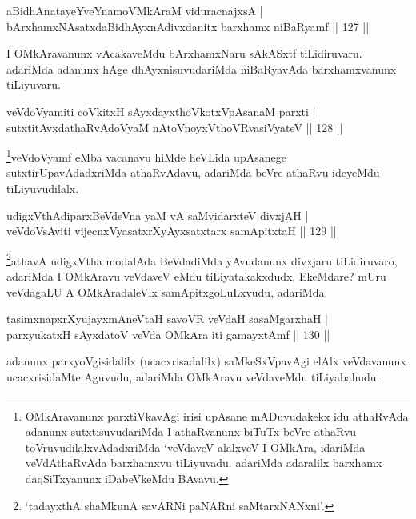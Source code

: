 \begin{shl}
aBidhAnatayeYveYnamoVMkAraM viduracnajxsA  | \\
bArxhamxNAsatxdaBidhAyxnAdivxdanitx barxhamx niBaRyamf \hfill||  127 ||  
\end{shl}

\begin{artha}
I OMkAravanunx vAcakaveMdu bArxhamxNaru sAkASxtf tiLidiruvaru. adariMda adanunx hAge dhAyxnisuvudariMda niBaRyavAda barxhamxvanunx tiLiyuvaru.
\end{artha}


\begin{shl}
veVdoV\s yamiti coVkitxH sAyxdayxthoVkotxVpAsanaM parxti  | \\
sutxtitAvxdathaRvAdoV\s yaM nAtoV\s noyxV\s thoVR\s vasiVyateV \hfill||  128 ||  
\end{shl}

\begin{artha}
\footnote{OMkAravanunx parxtiVkavAgi irisi upAsane mADuvudakekx idu athaRvAda adanunx sutxtisuvudariMda I athaRvanunx biTuTx beVre athaRvu toVruvudilalxvAdadxriMda `veVdaveV alalxveV I OMkAra, idariMda veVdAthaRvAda barxhamxvu tiLiyuvadu. adariMda adaralilx barxhamx daqSiTxyanunx iDabeVkeMdu BAvavu.}veVdoV\s yamf eMba vacanavu hiMde heVLida upAsanege sutxtirUpavAdadxriMda athaRvAdavu, adariMda beVre athaRvu ideyeMdu tiLiyuvudilalx.
\end{artha}


\begin{shl}
udigxVthAdiparxBeVdeVna yaM vA saMvidarxteV divxjAH  | \\
veVdoV\s sAviti vijecnxVyasatxrXyAyxsatxtarx samApitxtaH \hfill||  129 ||  
\end{shl}

\begin{artha}
\footnote{`tadayxthA shaMkunA savARNi paNARni saMtarxNANxni'.}athavA udigxVtha modalAda BeVdadiMda yAvudanunx divxjaru tiLidiruvaro, adariMda I OMkAravu veVdaveV eMdu tiLiyatakakxdudx, EkeMdare? mUru veVdagaLU A OMkAradaleVlx samApitxgoLuLxvudu, adariMda.
\end{artha}

\begin{shl}
tasimxnapxrXyujayxmAneV\s taH savoVR veVdaH sasaMgarxhaH   | \\
 parxyukatxH sAyxdatoV veVda OMkAra iti gamayxtAmf \hfill||  130 ||  
\end{shl}

\begin{artha}
adanunx parxyoVgisidalilx (ucacxrisadalilx) saMkeSxVpavAgi elAlx veVdavanunx ucacxrisidaMte Aguvudu, adariMda OMkAravu veVdaveMdu tiLiyabahudu.
\end{artha}

\centerline{}

